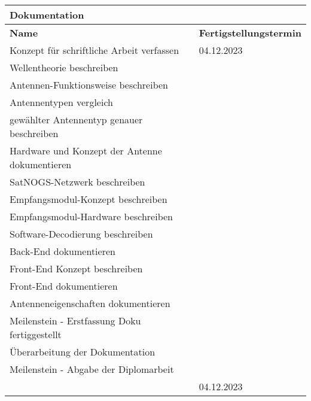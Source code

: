\begin{table}[!ht]
	\centering
	\begin{tabular}{|l|l|}
		\hline
		\textbf{Dokumentation} & ~ \\ \hline
		\textbf{Name} & \textbf{Fertigstellungstermin} \\ \hline
		Konzept für schriftliche Arbeit verfassen & 04.12.2023 \\ \hline
		Wellentheorie beschreiben & ~ \\ \hline
		Antennen-Funktionsweise beschreiben & ~ \\ \hline
		Antennentypen vergleich & ~ \\ \hline
		gewählter Antennentyp genauer beschreiben & ~ \\ \hline
		Hardware und Konzept der Antenne dokumentieren & ~ \\ \hline
		SatNOGS-Netzwerk beschreiben & ~ \\ \hline
		Empfangsmodul-Konzept beschreiben & ~ \\ \hline
		Empfangsmodul-Hardware beschreiben & ~ \\ \hline
		Software-Decodierung beschreiben & ~ \\ \hline
		Back-End dokumentieren & ~ \\ \hline
		Front-End Konzept beschreiben & ~ \\ \hline
		Front-End dokumentieren & ~ \\ \hline
		Antenneneigenschaften dokumentieren & ~ \\ \hline
		Meilenstein - Erstfassung Doku fertiggestellt & ~ \\ \hline
		Überarbeitung der Dokumentation & ~ \\ \hline
		Meilenstein - Abgabe der Diplomarbeit & ~ \\ \hline
		~ & 04.12.2023 \\ \hline
	\end{tabular}
\end{table}